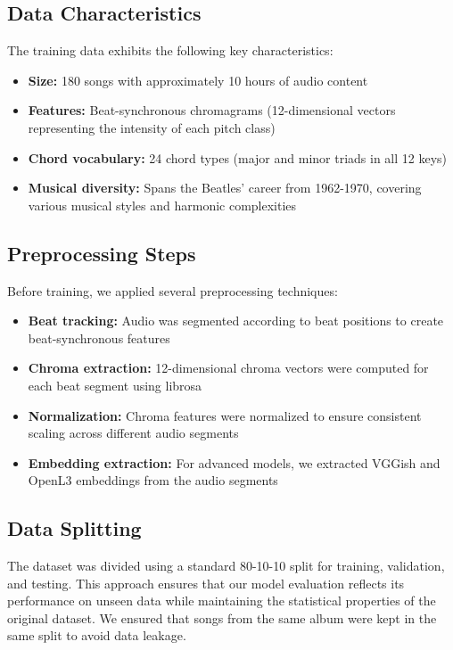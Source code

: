 \documentclass{article}
\begin{document}
\subsection{Data Characteristics}
The training data exhibits the following key characteristics:
\begin{itemize}
    \item \textbf{Size:} 180 songs with approximately 10 hours of audio content
    \item \textbf{Features:} Beat-synchronous chromagrams (12-dimensional vectors representing 
      the intensity of each pitch class)
    \item \textbf{Chord vocabulary:} 24 chord types (major and minor triads in all 12 keys)
    \item \textbf{Musical diversity:} Spans the Beatles' career from 1962-1970, covering various 
      musical styles and harmonic complexities
\end{itemize}

\subsection{Preprocessing Steps}
Before training, we applied several preprocessing techniques:
\begin{itemize}
    \item \textbf{Beat tracking:} Audio was segmented according to beat positions to create 
      beat-synchronous features
    \item \textbf{Chroma extraction:} 12-dimensional chroma vectors were computed for each beat 
      segment using librosa
    \item \textbf{Normalization:} Chroma features were normalized to ensure consistent scaling 
      across different audio segments
    \item \textbf{Embedding extraction:} For advanced models, we extracted VGGish and OpenL3 
      embeddings from the audio segments
\end{itemize}

\subsection{Data Splitting}
The dataset was divided using a standard 80-10-10 split for training, validation, and testing. 
This approach ensures that our model evaluation reflects its performance on unseen data while 
maintaining the statistical properties of the original dataset. We ensured that songs from the 
same album were kept in the same split to avoid data leakage.
\end{document}
